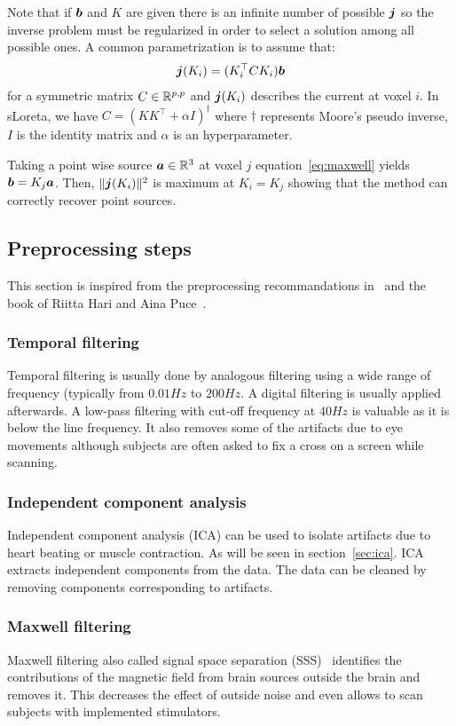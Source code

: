 Note that if $\boldsymbol{b}$ and $K$ are given there is an infinite number of possible
$\boldsymbol{j}$ so the inverse problem must be regularized in order to select a solution among all possible ones.
A common parametrization is to assume that:
\begin{align}
\boldsymbol{j}(K_i) = (K_i^{\top} C K_i) \boldsymbol{b}
\end{align}
for a symmetric matrix $C \in \mathbb{R}^{p, p}$ and $\boldsymbol{j}(K_i)$ describes the current at voxel $i$.
In sLoreta, we have $C = (K K^{\top} + \alpha I)^{\dagger}$ where $\dagger$
represents Moore's pseudo inverse, $I$ is the identity matrix and $\alpha$ is an hyperparameter. 

Taking a point wise source $\boldsymbol{a} \in \mathbb{R}^{3}$ at voxel $j$
equation~\eqref{eq:maxwell} yields $\boldsymbol{b} = K_j \boldsymbol{a}$.
Then, $\| \boldsymbol{j}(K_i) \|^2$ is maximum at $K_i=K_j$ showing that the method can correctly recover point sources.

\subsection{Preprocessing steps}
This section is inspired from the preprocessing recommandations
in~\cite{jas2018reproducible} and the book of Riitta Hari and Aina
Puce~\cite{hari2017meg}. 

\subsubsection{Temporal filtering}
Temporal filtering is usually done by analogous filtering using a wide range of
frequency (typically from $0.01 Hz$ to $200Hz$.
A digital filtering is usually applied afterwards. A low-pass filtering with
cut-off frequency at $40 Hz$ is valuable as it is below the line frequency. It
also removes some of the artifacts due to eye movements although subjects are
often asked to fix a cross on a screen while scanning.

\subsubsection{Independent component analysis}
Independent component analysis (ICA) can be used to isolate artifacts due to
heart beating or muscle contraction. As will be seen in section~\ref{sec:ica}.
ICA extracts independent components from the data. The data can be cleaned by
removing components corresponding to artifacts.

\subsubsection{Maxwell filtering}
Maxwell filtering also called signal space separation
(SSS)~\cite{taulu2006spatiotemporal} identifies the contributions of the
magnetic field from brain sources outside the brain and removes it.
This decreases the effect of outside noise and even allows to scan subjects with
implemented stimulators.


